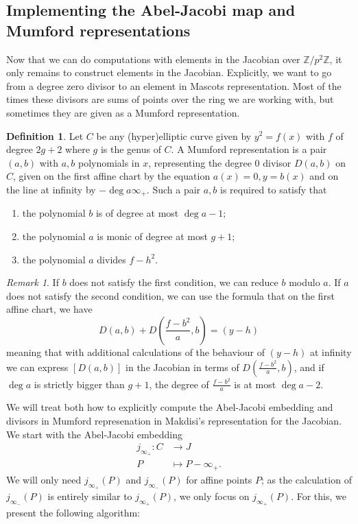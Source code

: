 \documentclass[12pt]{article}
\newcommand{\Z}{\mathbb{Z}}
\theoremstyle{plain}
\theoremstyle{definition}
\newtheorem{defn}[thm]{Definition} %
\theoremstyle{remark}
\newtheorem{rem}[thm]{Remark} %
\begin{document}
\subsection{Implementing the Abel-Jacobi map and Mumford representations}
Now that we can do computations with elements in the Jacobian over $\Z/p^2\Z$, it only remains to construct elements in the Jacobian. Explicitly, we want to go from a degree zero divisor to an element in Mascots representation. Most of the times these divisors are sums of points over the ring we are working with, but sometimes they are given as a Mumford representation.
\begin{defn}
Let $C$ be any (hyper)elliptic curve given by $y^2 = f(x)$ with $f$ of degree $2g+2$ where $g$ is the genus of $C$. A Mumford representation is a pair $(a,b)$ with $a,b$ polynomials in $x$, representing the degree $0$ divisor $D(a,b)$ on $C$, given on the first affine chart by the equation $a(x) = 0, y = b(x)$ and on the line at infinity by $-\deg a\infty_+$. Such a pair $a,b$ is required to satisfy that
\begin{enumerate}
\item the polynomial $b$ is of degree at most $\deg a -1$;
\item the polynomial $a$ is monic of degree at most $g+1$;
\item the polynomial $a$ divides $f - h^2$.
\end{enumerate}
\end{defn}
\begin{rem}
If $b$ does not satisfy the first condition, we can reduce $b$ modulo $a$. If $a$ does not satisfy the second condition, we can use the formula that on the first affine chart, we have
\[
D(a,b) + D(\frac{f-b^2}{a},b) = (y-h)
\]
meaning that with additional calculations of the behaviour of $(y-h)$ at infinity we can express $[D(a,b)]$ in the Jacobian in terms of $D(\frac{f-b^2}{a},b)$, and if $\deg a$ is strictly bigger than $g+1$, the degree of $\frac{f-b^2}{a}$ is at most $\deg a -2$.
\end{rem}

We will treat both how to explicitly compute the Abel-Jacobi embedding and divisors in Mumford represenation in Makdisi's representation for the Jacobian. We start with the Abel-Jacobi embedding 
\begin{align*}
j_{\infty_+}: C &\to J \\
              P &\mapsto P-\infty_+.
\end{align*}
We will only need $j_{\infty_+}(P)$ and $j_{\infty_-}(P)$ for affine points $P$; as the calculation of $j_{\infty_-}(P)$ is entirely similar to $j_{\infty_+}(P)$, we only focus on $j_{\infty_+}(P)$. For this, we present the following algorithm:
\end{document}
